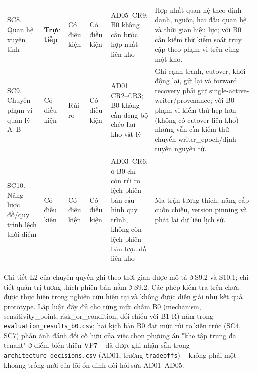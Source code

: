 \documentclass[a4paper,11pt]{article}
\begin{document}
\begin{longtable}{@{}p{2.55cm}p{1.35cm}p{1.35cm}p{1.35cm}p{2.95cm}p{4.5cm}@{}}
SC8. Quan hệ xuyên tỉnh & \textbf{Trực tiếp} & Có điều kiện & Có điều kiện & AD05, CR9; B0 không cần bước hợp nhất liên kho & Hợp nhất quan hệ theo định danh, nguồn, hai đầu quan hệ và thời gian hiệu lực; với B0 cần kiểm thử kiểm soát truy cập theo phạm vi trên cùng một kho. \\
SC9. Chuyển phạm vi quản lý A--B & Có điều kiện & Rủi ro & Có điều kiện & AD01, CR2--CR3; B0 không cần đồng bộ chéo hai kho vật lý & Ghi cạnh tranh, cutover, khởi động lại, gửi lại và forward recovery phải giữ single-active-writer/provenance; với B0 phạm vi kiểm thử hẹp hơn (không có cutover liên kho) nhưng vẫn cần kiểm thử chuyển writer\_epoch/định tuyến nguyên tử. \\
SC10. Nâng lược đồ/quy trình lệch thời điểm & Có điều kiện & Có điều kiện & Có điều kiện & AD03, CR6; ở B0 chỉ còn rủi ro lệch phiên bản cấu hình quy trình, không còn lệch phiên bản lược đồ liên kho & Ma trận tương thích, nâng cấp cuốn chiếu, version pinning và phát lại dữ liệu lịch sử. \\
\end{longtable}
\normalsize

Chi tiết L2 của chuyển quyền ghi theo thời gian được mô tả ở S9.2 và S10.1; chi tiết quản trị tương thích phiên bản nằm ở S9.2. Các phép kiểm tra trên chưa được thực hiện trong nghiên cứu hiện tại và không được diễn giải như kết quả prototype. Lập luận đầy đủ cho từng mức chấm B0 (mechanism, sensitivity\_point, risk\_or\_condition, đối chiếu với B1-R) nằm trong \texttt{evaluation\_results\_b0.csv}; hai kịch bản B0 đạt mức rủi ro kiến trúc (SC4, SC7) phản ánh đánh đổi cố hữu của việc chọn phương án "kho tập trung đa tenant" ở điểm biến thiên VP7 -- đã được ghi nhận sẵn trong \texttt{architecture\_decisions.csv} (AD01, trường \texttt{tradeoffs}) -- không phải một khoảng trống mới của lõi ổn định đòi hỏi sửa AD01--AD05.
\end{document}
